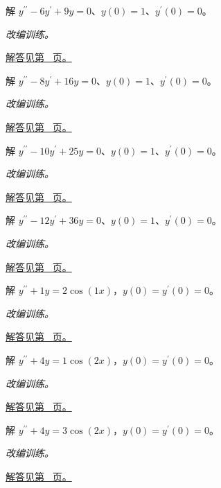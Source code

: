 \documentclass[12pt,fontset=fandol]{ctexart}
\begin{document}
\begin{example}[重复特征根]\label{ex:c23q15}
解 $y^{\prime\prime}-6y^{\prime}+9y=0$、$y(0)=1$、$y^{\prime}(0)=0$。
\par\textit{改编训练。}\par\hyperref[ans:c23q15]{解答见第~\pageref{ans:c23q15} 页。}
\end{example}
\begin{example}[重复特征根]\label{ex:c23q16}
解 $y^{\prime\prime}-8y^{\prime}+16y=0$、$y(0)=1$、$y^{\prime}(0)=0$。
\par\textit{改编训练。}\par\hyperref[ans:c23q16]{解答见第~\pageref{ans:c23q16} 页。}
\end{example}
\begin{example}[重复特征根]\label{ex:c23q17}
解 $y^{\prime\prime}-10y^{\prime}+25y=0$、$y(0)=1$、$y^{\prime}(0)=0$。
\par\textit{改编训练。}\par\hyperref[ans:c23q17]{解答见第~\pageref{ans:c23q17} 页。}
\end{example}
\begin{example}[重复特征根]\label{ex:c23q18}
解 $y^{\prime\prime}-12y^{\prime}+36y=0$、$y(0)=1$、$y^{\prime}(0)=0$。
\par\textit{改编训练。}\par\hyperref[ans:c23q18]{解答见第~\pageref{ans:c23q18} 页。}
\end{example}
\begin{example}[共振强迫振动]\label{ex:c23q19}
解 $y^{\prime\prime}+1y=2\cos(1x)$，$y(0)=y^{\prime}(0)=0$。
\par\textit{改编训练。}\par\hyperref[ans:c23q19]{解答见第~\pageref{ans:c23q19} 页。}
\end{example}
\begin{example}[共振强迫振动]\label{ex:c23q20}
解 $y^{\prime\prime}+4y=1\cos(2x)$，$y(0)=y^{\prime}(0)=0$。
\par\textit{改编训练。}\par\hyperref[ans:c23q20]{解答见第~\pageref{ans:c23q20} 页。}
\end{example}
\begin{example}[共振强迫振动]\label{ex:c23q21}
解 $y^{\prime\prime}+4y=3\cos(2x)$，$y(0)=y^{\prime}(0)=0$。
\par\textit{改编训练。}\par\hyperref[ans:c23q21]{解答见第~\pageref{ans:c23q21} 页。}
\end{example}
\end{document}
